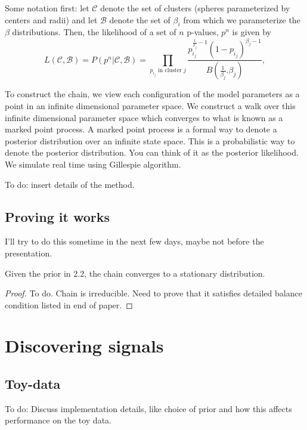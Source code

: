 \documentclass[12pt]{article}
\begin{document}
Some notation first: let $\mathcal{C}$ denote the set of clusters (spheres parameterized by centers and radii) and let $\mathcal{B}$ denote the set of $\beta_i$ from which 
we parameterize the $\beta$ distributions. Then, the likelihood of a set of $n$ p-values, $p^n$ is given by
 \[
L(\mathcal{C}, \mathcal{B}) = P( p^n | \mathcal{C}, \mathcal{B}) = \prod_{\mbox{$p_{i_j}$ in cluster $j$}}  \frac{ p_{i_j}^{\frac{1}{\beta_j} - 1} (1 - p_{i_j})^{\beta_j-1}}{B(\frac{1}{\beta_j}. \beta_j)},
\]

To construct the chain,  we view each configuration of the model parameters as a point in an infinite dimensional parameter space. 
We construct a  walk over this infinite dimensional parameter space which converges to what is known as a marked point process. 
A marked point process is a formal way to denote a posterior distribution over an infinite state space. 
This is a probabilistic way to denote the posterior distribution. 
You can think of it as the posterior likelihood. We simulate real time using Gillespie algorithm.



To do: insert details of the method. 


\subsection{Proving it works}
I'll try to do this sometime in the next few days, maybe not before the presentation. 



\begin{theorem}
Given the prior in 2.2, the chain converges to a stationary distribution. 
\end{theorem}
\begin{proof} 
To do. Chain is irreducible. Need to prove that it satisfies detailed balance condition 
listed in end of paper. 
\end{proof}



\section{Discovering signals}

\subsection{Toy-data}
To do:  Discuss implementation details, like choice of prior and how this affects performance on the toy data. 
\end{document}
